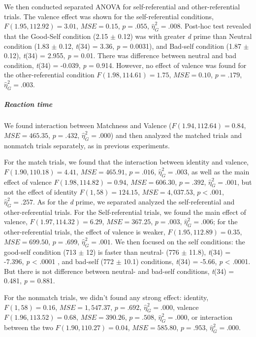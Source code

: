 \documentclass[
  english,
  man]{apa6}
\let\oldsubparagraph\subparagraph
\renewcommand{\subparagraph}[1]{\oldsubparagraph{#1}\mbox{}}
\begin{document}
We then conducted separated ANOVA for self-referential and other-referential trials. The valence effect was shown for the self-referential conditions, \(F(1.95, 112.92) = 3.01\), \(\mathit{MSE} = 0.15\), \(p = .055\), \(\hat{\eta}^2_G = .008\). Post-hoc test revealed that the Good-Self condition (2.15 \(\pm\) 0.12) was with greater \emph{d} prime than Neutral condition (1.83 \(\pm\) 0.12, \emph{t}(34) = 3.36, \emph{p} = 0.0031), and Bad-self condition (1.87 \(\pm\) 0.12), \emph{t}(34) = 2.955, \emph{p} = 0.01. There was difference between neutral and bad condition, \emph{t}(34) = -0.039, \emph{p} = 0.914. However, no effect of valence was found for the other-referential condition \(F(1.98, 114.61) = 1.75\), \(\mathit{MSE} = 0.10\), \(p = .179\), \(\hat{\eta}^2_G = .003\).

\hypertarget{reaction-time-10}{%
\subparagraph{Reaction time}\label{reaction-time-10}}

We found interaction between Matchness and Valence (\(F(1.94, 112.64) = 0.84\), \(\mathit{MSE} = 465.35\), \(p = .432\), \(\hat{\eta}^2_G = .000\)) and then analyzed the matched trials and nonmatch trials separately, as in previous experiments.

For the match trials, we found that the interaction between identity and valence, \(F(1.90, 110.18) = 4.41\), \(\mathit{MSE} = 465.91\), \(p = .016\), \(\hat{\eta}^2_G = .003\), as well as the main effect of valence \(F(1.98, 114.82) = 0.94\), \(\mathit{MSE} = 606.30\), \(p = .392\), \(\hat{\eta}^2_G = .001\), but not the effect of identity \(F(1, 58) = 124.15\), \(\mathit{MSE} = 4,037.53\), \(p < .001\), \(\hat{\eta}^2_G = .257\). As for the \emph{d} prime, we separated analyzed the self-referential and other-referential trials. For the Self-referential trials, we found the main effect of valence, \(F(1.97, 114.32) = 6.29\), \(\mathit{MSE} = 367.25\), \(p = .003\), \(\hat{\eta}^2_G = .006\); for the other-referential trials, the effect of valence is weaker, \(F(1.95, 112.89) = 0.35\), \(\mathit{MSE} = 699.50\), \(p = .699\), \(\hat{\eta}^2_G = .001\). We then focused on the self conditions: the good-self condition (713 \(\pm\) 12) is faster than neutral- (776 \(\pm\) 11.8), \emph{t}(34) = -7.396, \emph{p} \textless{} .0001 , and bad-self (772 \(\pm\) 10.1) conditions, \emph{t}(34) = -5.66, \emph{p} \textless{} .0001. But there is not difference between neutral- and bad-self conditions, \emph{t}(34) = 0.481, \emph{p} = 0.881.

For the nonmatch trials, we didn't found any strong effect: identity, \(F(1, 58) = 0.16\), \(\mathit{MSE} = 1,547.37\), \(p = .692\), \(\hat{\eta}^2_G = .000\), valence \(F(1.96, 113.52) = 0.68\), \(\mathit{MSE} = 390.26\), \(p = .508\), \(\hat{\eta}^2_G = .000\), or interaction between the two \(F(1.90, 110.27) = 0.04\), \(\mathit{MSE} = 585.80\), \(p = .953\), \(\hat{\eta}^2_G = .000\).
\end{document}
